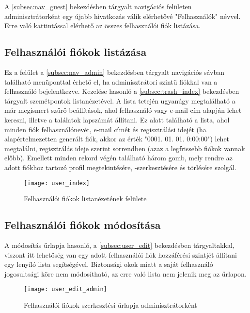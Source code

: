 A \ref{subsec:nav_guest} bekezdésben tárgyalt navigációs felületen adminisztrátorként egy újabb hivatkozás válik elérhetővé "Felhasználók" névvel. Erre való kattintással elérhető az összes felhasználói fiók listázása.

\subsection{Felhasználói fiókok listázása}
\label{subsec:user_index}

Ez a felület a \ref{subsec:nav_admin} bekezdésben tárgyalt navigációs sávban található menüponttal érhető el, ha adminisztrátori szintű fiókkal van a felhasználó bejelentkezve. Kezelése hasonló a \ref{subsec:trash_index} bekezdésben tárgyalt szemétpontok listanézetével. A lista tetején ugyanúgy megtalálható a már megismert szűrő beállítások, ahol felhasználó vagy e-mail cím alapján lehet keresni, illetve a találatok lapszámát állítani. Ez alatt található a lista, ahol minden fiók felhasználónevét, e-mail címét és regisztrálási idejét (ha alapértelmezetten generált fiók, akkor az érték "0001. 01. 01. 0:00:00") lehet megtalálni, regisztrálás ideje szerint sorrendben (azaz a legfrissebb fiókok vannak előbb). Emellett minden rekord végén található három gomb, mely rendre az adott fiókhoz tartozó profil megtekintésére, -szerkesztésére és törlésére szolgál.

\begin{figure}[H]
	\centering
	\texttt{[image: user\_index]}
	\caption{Felhasználói fiókok listanézetének felülete}
	\label{fig:user_index}
\end{figure}

\subsection{Felhasználói fiókok módosítása}
\label{subsec:user_edit_admin}

A módosítás űrlapja hasonló, a \ref{subsec:user_edit} bekezdésben tárgyaltakkal, viszont itt lehetőség van egy adott felhasználói fiók hozzáférési szintjét állítani egy lenyíló lista segítségével. Biztonsági okok miatt a saját felhasználó jogosultsági köre nem módosítható, az erre való lista nem jelenik meg az űrlapon.

\begin{figure}[H]
	\centering
	\texttt{[image: user\_edit\_admin]}
	\caption{Felhasználói fiókok szerkesztési űrlapja adminisztrátorként}
	\label{fig:user_edit_admin}
\end{figure}


